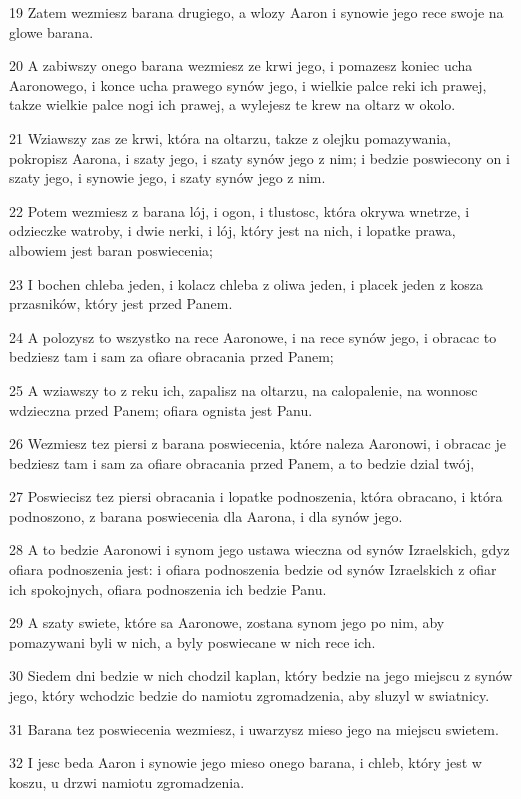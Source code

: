 \par 19 Zatem wezmiesz barana drugiego, a wlozy Aaron i synowie jego rece swoje na glowe barana.
\par 20 A zabiwszy onego barana wezmiesz ze krwi jego, i pomazesz koniec ucha Aaronowego, i konce ucha prawego synów jego, i wielkie palce reki ich prawej, takze wielkie palce nogi ich prawej, a wylejesz te krew na oltarz w okolo.
\par 21 Wziawszy zas ze krwi, która na oltarzu, takze z olejku pomazywania, pokropisz Aarona, i szaty jego, i szaty synów jego z nim; i bedzie poswiecony on i szaty jego, i synowie jego, i szaty synów jego z nim.
\par 22 Potem wezmiesz z barana lój, i ogon, i tlustosc, która okrywa wnetrze, i odzieczke watroby, i dwie nerki, i lój, który jest na nich, i lopatke prawa, albowiem jest baran poswiecenia;
\par 23 I bochen chleba jeden, i kolacz chleba z oliwa jeden, i placek jeden z kosza przasników, który jest przed Panem.
\par 24 A polozysz to wszystko na rece Aaronowe, i na rece synów jego, i obracac to bedziesz tam i sam za ofiare obracania przed Panem;
\par 25 A wziawszy to z reku ich, zapalisz na oltarzu, na calopalenie, na wonnosc wdzieczna przed Panem; ofiara ognista jest Panu.
\par 26 Wezmiesz tez piersi z barana poswiecenia, które naleza Aaronowi, i obracac je bedziesz tam i sam za ofiare obracania przed Panem, a to bedzie dzial twój,
\par 27 Poswiecisz tez piersi obracania i lopatke podnoszenia, która obracano, i która podnoszono, z barana poswiecenia dla Aarona, i dla synów jego.
\par 28 A to bedzie Aaronowi i synom jego ustawa wieczna od synów Izraelskich, gdyz ofiara podnoszenia jest: i ofiara podnoszenia bedzie od synów Izraelskich z ofiar ich spokojnych, ofiara podnoszenia ich bedzie Panu.
\par 29 A szaty swiete, które sa Aaronowe, zostana synom jego po nim, aby pomazywani byli w nich, a byly poswiecane w nich rece ich.
\par 30 Siedem dni bedzie w nich chodzil kaplan, który bedzie na jego miejscu z synów jego, który wchodzic bedzie do namiotu zgromadzenia, aby sluzyl w swiatnicy.
\par 31 Barana tez poswiecenia wezmiesz, i uwarzysz mieso jego na miejscu swietem.
\par 32 I jesc beda Aaron i synowie jego mieso onego barana, i chleb, który jest w koszu, u drzwi namiotu zgromadzenia.
